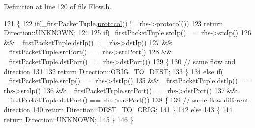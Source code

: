 Definition at line 120 of file Flow.\-h.


\begin{DoxyCode}
121     \{
122         \textcolor{keywordflow}{if}(\_firstPacketTuple.\hyperlink{class_vsid_common_1_1_i_pv4_tuple_a6e05cf962bef53a9f3b1772a04e3878f}{protocol}() != rhs->protocol())
123             \textcolor{keywordflow}{return} \hyperlink{class_vsid_common_1_1_flow_a82b0cd313a915325b97133fd8e104781a696b031073e74bf2cb98e5ef201d4aa3}{Direction::UNKNOWN};
124 
125         \textcolor{keywordflow}{if}(\_firstPacketTuple.\hyperlink{class_vsid_common_1_1_i_pv4_tuple_aa1f9b5071312e6062b5bd39ada560c43}{srcIp}() == rhs->srcIp() 
126                 && \_firstPacketTuple.\hyperlink{class_vsid_common_1_1_i_pv4_tuple_a020b9a4b89155b0e4a796d3367e577eb}{dstIp}() == rhs->dstIp()
127                 && \_firstPacketTuple.\hyperlink{class_vsid_common_1_1_i_pv4_tuple_a4092c3bd8281c8f5a8972c5c6c6f4bac}{srcPort}() == rhs->srcPort()
128                 && \_firstPacketTuple.\hyperlink{class_vsid_common_1_1_i_pv4_tuple_afc04d9dcf937c67ce60a2f2fcc0c7c10}{dstPort}() == rhs->dstPort())
129         \{
130             \textcolor{comment}{// same flow and direction}
131             
132             \textcolor{keywordflow}{return} \hyperlink{class_vsid_common_1_1_flow_a82b0cd313a915325b97133fd8e104781a0d7777af293731f36e6d38a63c40c8d9}{Direction::ORIG\_TO\_DEST};
133         \}
134         \textcolor{keywordflow}{else} \textcolor{keywordflow}{if}( \_firstPacketTuple.\hyperlink{class_vsid_common_1_1_i_pv4_tuple_aa1f9b5071312e6062b5bd39ada560c43}{srcIp}() == rhs->dstIp() 
135                 && \_firstPacketTuple.\hyperlink{class_vsid_common_1_1_i_pv4_tuple_a020b9a4b89155b0e4a796d3367e577eb}{dstIp}() == rhs->srcIp()
136                 && \_firstPacketTuple.\hyperlink{class_vsid_common_1_1_i_pv4_tuple_a4092c3bd8281c8f5a8972c5c6c6f4bac}{srcPort}() == rhs->dstPort()
137                 && \_firstPacketTuple.\hyperlink{class_vsid_common_1_1_i_pv4_tuple_afc04d9dcf937c67ce60a2f2fcc0c7c10}{dstPort}() == rhs->srcPort())
138         \{
139             \textcolor{comment}{// same flow different direction}
140             \textcolor{keywordflow}{return} \hyperlink{class_vsid_common_1_1_flow_a82b0cd313a915325b97133fd8e104781acec4e9f5cd57d2a319a172cba0a6d505}{Direction::DEST\_TO\_ORIG};
141         \}
142         \textcolor{keywordflow}{else}
143         \{
144             \textcolor{keywordflow}{return} \hyperlink{class_vsid_common_1_1_flow_a82b0cd313a915325b97133fd8e104781a696b031073e74bf2cb98e5ef201d4aa3}{Direction::UNKNOWN};
145         \}
146     \}
\end{DoxyCode}



